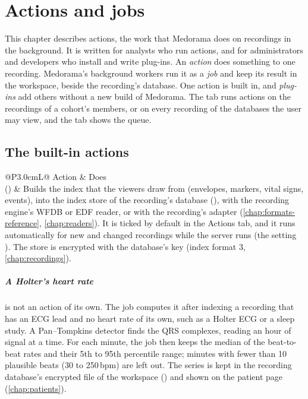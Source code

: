 \chapter{Actions and jobs}
\label{chap:actions}

This chapter describes actions, the work that Medorama does on recordings in the background. It
is written for analysts who run actions, and for administrators and developers who install and
write plug-ins. An \emph{action} does something to one recording. Medorama's background workers
run it as a \emph{job} and keep its result in the workspace, beside the recording's database.
One action is built in, and \emph{plug-ins} add others without a new build of Medorama. The
 tab runs actions on the recordings of a cohort's members, or on every recording of
the databases the user may view, and the  tab shows the queue.

\section{The built-in actions}
\label{sec:actions-builtin}

\begin{table}[htbp]
\caption{The built-in actions.}
\label{tab:actions-builtin}
\begin{tabularx}{\linewidth}{@{}P{3.0cm}L@{}}
\toprule
{\tabhead Action} & {\tabhead Does} \\
\midrule
{} () & Builds the index that the viewers draw from (envelopes, markers,
  vital signs, events), into the index store of the recording's database
  (), with the recording engine's WFDB or EDF reader, or with the
  recording's adapter (\cref{chap:formats-reference}, \cref{chap:readers}). It is ticked by
  default in the Actions tab, and it runs automatically for new and changed recordings while the
  server runs (the setting ). The store is encrypted with the database's key
  (index format 3, \cref{chap:recordings}). \\
\bottomrule
\end{tabularx}
\end{table}

\paragraph{A Holter's heart rate} is not an action of its own. The  job computes it
after indexing a recording that has an ECG lead and no heart rate of its own, such as a Holter
ECG or a sleep study. A Pan--Tompkins detector finds the QRS complexes, reading an hour of
signal at a time. For each minute, the job then keeps the median of the beat-to-beat rates and
their 5th to 95th percentile range; minutes with fewer than 10 plausible beats (30 to
250\,bpm) are left out. The series is kept in the recording database's encrypted file of the
workspace () and shown on the patient page (\cref{chap:patients}).

